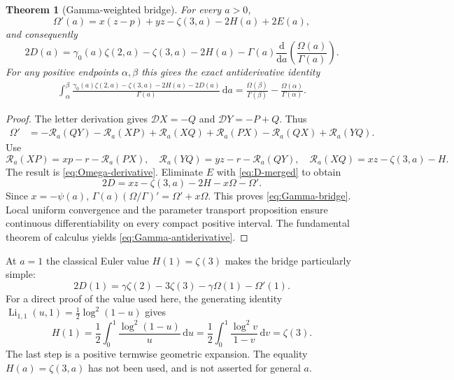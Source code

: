 \documentclass[11pt]{article}
\numberwithin{equation}{section}
\newtheorem{theorem}{Theorem}[section]
\theoremstyle{definition}
\newcommand{\R}{\mathcal R}
\newcommand{\Li}{\operatorname{Li}}
\newcommand{\dd}{\,\mathrm d}
\begin{document}
\begin{theorem}[Gamma-weighted bridge]\label{thm:gamma-bridge}
For every $a>0$,
\begin{equation}\label{eq:Omega-derivative}
 \Omega'(a)=x(z-p)+yz-\zeta(3,a)-2H(a)+2E(a),
\end{equation}
and consequently
\begin{equation}\label{eq:Gamma-bridge}
 \boxed{\displaystyle
 2D(a)=\gamma_0(a)\zeta(2,a)-\zeta(3,a)-2H(a)
       -\Gamma(a)\frac{\mathrm d}{\mathrm da}
                          \left(\frac{\Omega(a)}{\Gamma(a)}\right).}
\end{equation}
For any positive endpoints $\alpha,\beta$ this gives the exact
antiderivative identity
\begin{align}\label{eq:Gamma-antiderivative}
 \int_\alpha^\beta
 \frac{\gamma_0(a)\zeta(2,a)-\zeta(3,a)-2H(a)-2D(a)}{\Gamma(a)}\dd a
 =\frac{\Omega(\beta)}{\Gamma(\beta)}
  -\frac{\Omega(\alpha)}{\Gamma(\alpha)}.
\end{align}
\end{theorem}
\begin{proof}
The letter derivation gives $\mathcal DX=-Q$ and
$\mathcal DY=-P+Q$. Thus
\begin{align*}
 \Omega'&=-\R_a(QY)-\R_a(XP)+\R_a(XQ)
               +\R_a(PX)-\R_a(QX)+\R_a(YQ).
\end{align*}
Use
\[
 \R_a(XP)=xp-r-\R_a(PX),\quad
 \R_a(YQ)=yz-r-\R_a(QY),\quad
 \R_a(XQ)=xz-\zeta(3,a)-H.
\]
The result is \eqref{eq:Omega-derivative}. Eliminate $E$ with
\eqref{eq:D-merged} to obtain
\[
 2D=xz-\zeta(3,a)-2H-x\Omega-\Omega'.
\]
Since $x=-\psi(a)$,
$\Gamma(a)(\Omega/\Gamma)'=\Omega'+x\Omega$. This proves
\eqref{eq:Gamma-bridge}. Local uniform convergence and the parameter
transport proposition ensure continuous differentiability on every compact
positive interval. The fundamental theorem of calculus yields
\eqref{eq:Gamma-antiderivative}.
\end{proof}

At $a=1$ the classical Euler value $H(1)=\zeta(3)$ makes the bridge
particularly simple:
\begin{equation}\label{eq:D-at-one}
 2D(1)=\gamma\zeta(2)-3\zeta(3)-\gamma\Omega(1)-\Omega'(1).
\end{equation}
For a direct proof of the value used here, the generating identity
$\Li_{1,1}(u,1)=\tfrac12\log^2(1-u)$ gives
\[
 H(1)=\frac12\int_0^1\frac{\log^2(1-u)}u\dd u
     =\frac12\int_0^1\frac{\log^2 v}{1-v}\dd v
     =\zeta(3).
\]
The last step is a positive termwise geometric expansion. The equality
$H(a)=\zeta(3,a)$ has not been used, and is not asserted for general $a$.
\end{document}
